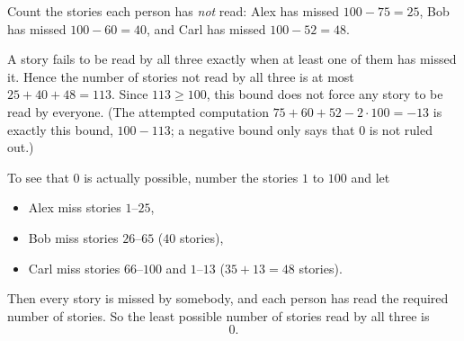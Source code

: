 Count the stories each person has \emph{not} read: Alex has missed $100-75=25$, Bob has missed $100-60=40$, and Carl has missed $100-52=48$.

A story fails to be read by all three exactly when at least one of them has missed it. Hence the number of stories not read by all three is at most $25+40+48=113$. Since $113\ge 100$, this bound does not force any story to be read by everyone. (The attempted computation $75+60+52-2\cdot 100=-13$ is exactly this bound, $100-113$; a negative bound only says that $0$ is not ruled out.)

To see that $0$ is actually possible, number the stories $1$ to $100$ and let
\begin{itemize}
\item Alex miss stories $1$--$25$,
\item Bob miss stories $26$--$65$ ($40$ stories),
\item Carl miss stories $66$--$100$ and $1$--$13$ ($35+13=48$ stories).
\end{itemize}
Then every story is missed by somebody, and each person has read the required number of stories. So the least possible number of stories read by all three is
\[\boxed{0}.\]
